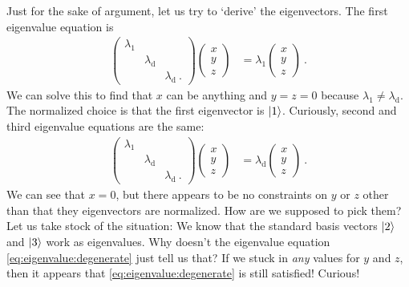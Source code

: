 \documentclass[12pt, oneside]{report}    %
\begin{document}
Just for the sake of argument, let us try to `derive' the eigenvectors. The first eigenvalue equation is
\begin{align}
    \begin{pmatrix}
        \lambda_1 & & \\
        & \lambda_\text{d} & \\
        & & \lambda_\text{d} \ .
    \end{pmatrix}
    \begin{pmatrix}
        x\\y\\z
    \end{pmatrix}
    &= 
    \lambda_1
    \begin{pmatrix}
        x\\y\\z
    \end{pmatrix} \ .
\end{align}
We can solve this to find that $x$ can be anything and $y=z=0$ because $\lambda_1\neq \lambda_\text{d}$. The normalized choice is that the first eigenvector is $\left|1\right\rangle$. Curiously, second and third eigenvalue equations are the same:
\begin{align}
    \begin{pmatrix}
        \lambda_1 & & \\
        & \lambda_\text{d} & \\
        & & \lambda_\text{d} \ .
    \end{pmatrix}
    \begin{pmatrix}
        x\\y\\z
    \end{pmatrix}
    &= 
    \lambda_\text{d}
    \begin{pmatrix}
        x\\y\\z
    \end{pmatrix} \ .
    \label{eq:eigenvalue:degenerate}
\end{align}
We can see that $x=0$, but there appears to be no constraints on $y$ or $z$ other than that they eigenvectors are normalized. How are we supposed to pick them? Let us take stock of the situation: We know that the standard basis vectors $\left|2\right\rangle$ and $\left|3\right\rangle$ work as eigenvalues. Why doesn't the eigenvalue equation \eqref{eq:eigenvalue:degenerate} just tell us that? If we stuck in \emph{any} values for $y$ and $z$, then it appears that \eqref{eq:eigenvalue:degenerate} is still satisfied! Curious!
\end{document}
